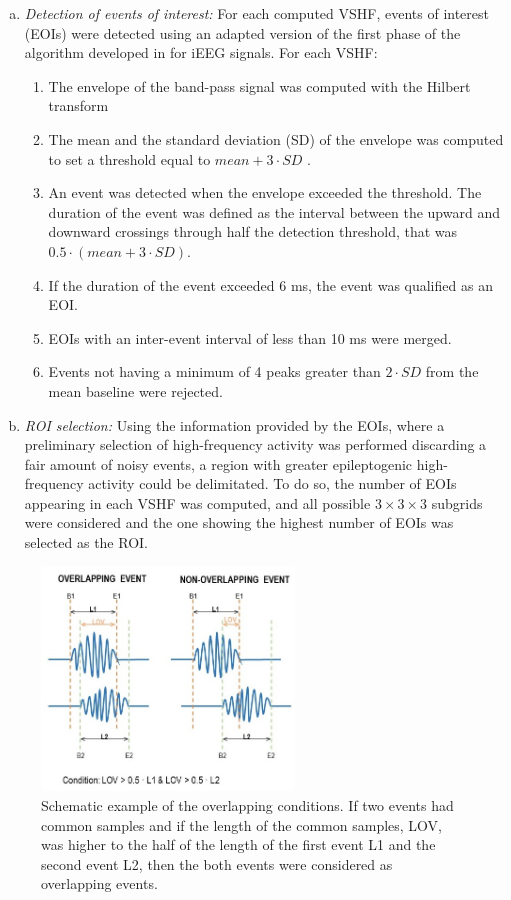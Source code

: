 \begin{enumerate}[(a)]
\item \textit{Detection of events of interest:} For each computed VSHF, events of interest (EOIs) were detected using an adapted version of the first phase of the algorithm developed in \citep{Burnos2014} for iEEG signals. For each VSHF:

\begin{enumerate}[(1)]
\item The envelope of the band-pass signal was computed with the Hilbert transform
\item The mean and the standard deviation (SD) of the envelope was computed to set a threshold equal to $ mean + 3 \cdot SD$ . 
\item An event was detected when the envelope exceeded the threshold. The duration of the event was defined as the interval between the upward and downward crossings through half the detection threshold, that was $ 0.5 \cdot (mean + 3 \cdot SD) $. 
\item If the duration of the event exceeded 6 ms, the event was qualified as an EOI.
\item EOIs with an inter-event interval of less than 10 ms were merged.
\item Events not having a minimum of 4 peaks greater than $2 \cdot SD$ from the mean baseline were rejected. 
\end{enumerate}

\item \textit{ROI selection:} Using the information provided by the EOIs, where a preliminary selection of high-frequency activity was performed discarding a fair amount of noisy events, a region with greater epileptogenic high-frequency activity could be delimitated. To do so, the number of EOIs appearing in each VSHF was computed, and all possible $3 \times 3 \times 3$ subgrids were considered and the one showing the highest number of EOIs was selected as the ROI.

\end{enumerate}

\begin{figure}[h]
\centering
\includegraphics[width=0.6\textwidth]{Images/fig3-2.jpg}
\caption{Schematic example of the overlapping conditions. If two events had common samples and if the length of the common samples, LOV, was higher to the half of the length of the first event L1 and the second event L2, then the both events were considered as overlapping events.}
\label{fig:3-2}
\end{figure} 

